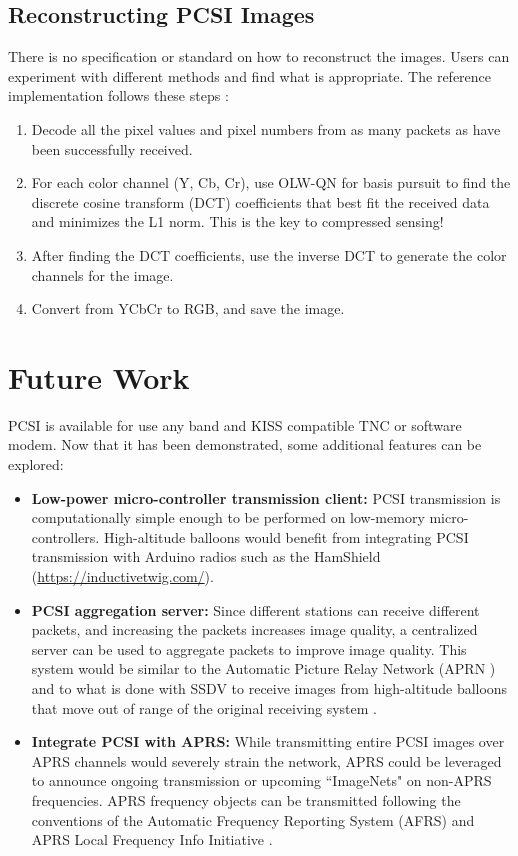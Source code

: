 \documentclass[letterpaper]{article}
\begin{document}
\subsection{Reconstructing PCSI Images}
There is no specification or standard on how to reconstruct the images. Users can experiment with different methods and find what is appropriate. The reference implementation follows these steps \cite{rtpyrunner}:

\begin{enumerate}
    \item Decode all the pixel values and pixel numbers from as many packets as have been successfully received.
    \item For each color channel (Y, Cb, Cr), use OLW-QN for basis pursuit \cite{OWL} to find the discrete cosine transform (DCT) coefficients that best fit the received data and minimizes the L1 norm. This is the key to compressed sensing!
    \item After finding the DCT coefficients, use the inverse DCT to generate the color channels for the image.
    \item Convert from YCbCr to RGB, and save the image.
\end{enumerate}




\section{Future Work}
PCSI is available for use any band and KISS compatible TNC or software modem. Now that it has been demonstrated, some additional features can be explored:
\begin{itemize}
    \item\textbf{Low-power micro-controller transmission client:} PCSI transmission is computationally simple enough to be performed on low-memory micro-controllers. High-altitude balloons would benefit from integrating PCSI transmission with Arduino radios such as the HamShield (\url{https://inductivetwig.com/}).
    \item \textbf{PCSI aggregation server:} Since different stations can receive different packets, and increasing the packets increases image quality, a centralized server can be used to aggregate packets to improve image quality. This system would be similar to the Automatic Picture Relay Network (APRN \cite{aprn}) and to what is done with SSDV to receive images from high-altitude balloons that move out of range of the original receiving system \cite{ssdvaggregator}.
    \item \textbf{Integrate PCSI with APRS:} While transmitting entire PCSI images over APRS channels would severely strain the network, APRS could be leveraged to announce ongoing transmission or upcoming ``ImageNets" on non-APRS frequencies. APRS frequency objects can be transmitted following the conventions of the Automatic Frequency Reporting System (AFRS) \cite{afrs} and APRS Local Frequency Info Initiative \cite{localinfo}.
    
\end{itemize}
\end{document}
